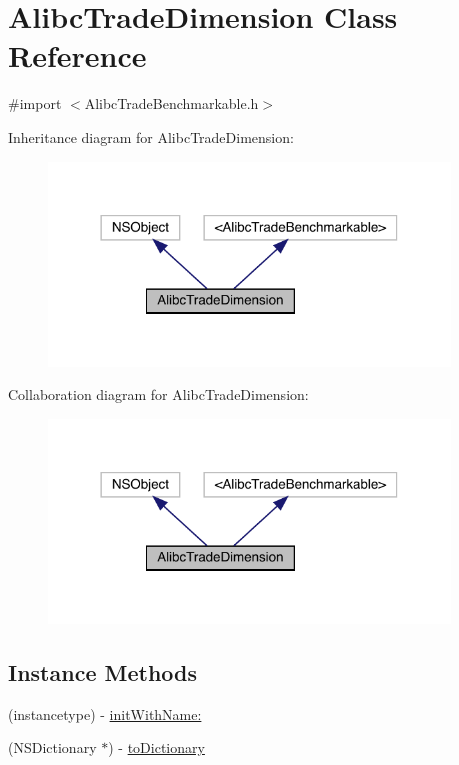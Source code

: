\hypertarget{interface_alibc_trade_dimension}{}\section{Alibc\+Trade\+Dimension Class Reference}
\label{interface_alibc_trade_dimension}


{\ttfamily \#import $<$Alibc\+Trade\+Benchmarkable.\+h$>$}



Inheritance diagram for Alibc\+Trade\+Dimension\+:\nopagebreak
\begin{figure}[H]
\begin{center}
\leavevmode
\includegraphics[width=302pt]{interface_alibc_trade_dimension__inherit__graph}
\end{center}
\end{figure}


Collaboration diagram for Alibc\+Trade\+Dimension\+:\nopagebreak
\begin{figure}[H]
\begin{center}
\leavevmode
\includegraphics[width=302pt]{interface_alibc_trade_dimension__coll__graph}
\end{center}
\end{figure}
\subsection*{Instance Methods}
\begin{DoxyCompactItemize}
\item 
(instancetype) -\/ \mbox{\hyperlink{interface_alibc_trade_dimension_a2df6a6cfa8924b826bc717db2d8ea518}{init\+With\+Name\+:}}
\end{DoxyCompactItemize}
\textbf{ }\par
\begin{DoxyCompactItemize}
\item 
(N\+S\+Dictionary $\ast$) -\/ \mbox{\hyperlink{interface_alibc_trade_dimension_a6d586f1f92f9b2273ed6794101aa7589}{to\+Dictionary}}
\end{DoxyCompactItemize}


